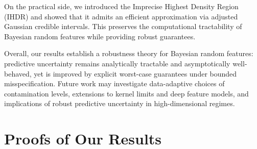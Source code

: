 \documentclass[12pt, english, oneside, a4paper]{article}
\begin{document}
On the practical side, we introduced the Imprecise Highest Density
Region (IHDR) and showed that it admits an efficient approximation
via adjusted Gaussian credible intervals. This preserves the computational
tractability of Bayesian random features while providing robust guarantees.

Overall, our results establish a robustness theory for Bayesian random
features: predictive uncertainty remains analytically tractable and
asymptotically well-behaved, yet is improved by explicit worst-case
guarantees under bounded misspecification. Future work may investigate
data-adaptive choices of contamination levels, extensions to kernel
limits and deep feature models, and implications of
robust predictive uncertainty in high-dimensional regimes.


\appendix




% 


\appendix
\onecolumn
\section{Proofs of Our Results}\label{app-proofs}





\end{document}
